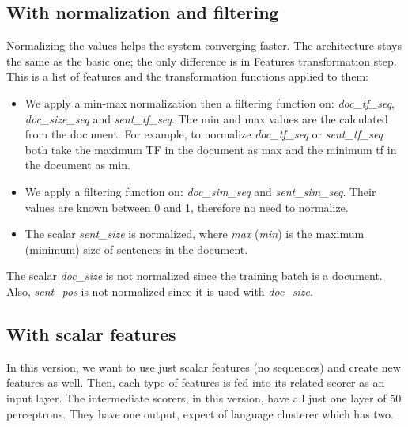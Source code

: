 \documentclass[12pt, oneside, a4paper]{article}
\begin{document}
\subsection{With normalization and filtering}

Normalizing the values helps the system converging faster. 
The architecture stays the same as the basic one; the only difference is in Features transformation step. 
This is a list of features and the transformation functions applied to them:
\begin{itemize}
	\item We apply a min-max normalization then a filtering function on: \textit{doc\_tf\_seq}, \textit{doc\_size\_seq} and \textit{sent\_tf\_seq}. 
	The min and max values are the calculated from the document. 
	For example, to normalize \textit{doc\_tf\_seq} or \textit{sent\_tf\_seq} both take the maximum TF in the document as max and the minimum tf in the document as min.
	\item We apply a filtering function on: \textit{doc\_sim\_seq} and \textit{sent\_sim\_seq}. 
	Their values are known between 0 and 1, therefore no need to normalize.
	\item The scalar \textit{sent\_size} is normalized, where \textit{max} (\textit{min}) is the maximum (minimum) size of sentences in the document.
\end{itemize}
The scalar \textit{doc\_size} is not normalized since the training batch is a document. 
Also, \textit{sent\_pos} is not normalized since it is used with \textit{doc\_size}.

\subsection{With scalar features}

In this version, we want to use just scalar features (no sequences) and create new features as well. 
Then, each type of features is fed into its related scorer as an input layer. 
The intermediate scorers, in this version, have all just one layer of 50 perceptrons. 
They have one output, expect of language clusterer which has two. 
\end{document}

